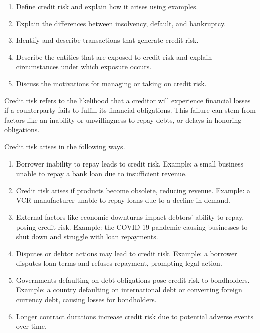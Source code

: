 
\begin{crkeybox}
\begin{enumerate}[label=\textbf{\alph*.},leftmargin=2em]
\item Define credit risk and explain how it arises using examples.
\item Explain the differences between insolvency, default, and bankruptcy.
\item Identify and describe transactions that generate credit risk.
\item Describe the entities that are exposed to credit risk and explain circumstances under which exposure occurs.
\item Discuss the motivations for managing or taking on credit risk.
\end{enumerate}
\end{crkeybox}


\begin{crdefbox}
Credit risk refers to the likelihood that a creditor will experience financial
losses if a counterparty fails to fulfill its financial obligations. This
failure can stem from factors like an inability or unwillingness to repay
debts, or delays in honoring obligations.
\end{crdefbox}

Credit risk arises in the following ways.

\begin{enumerate}
\item {} Borrower inability to repay leads to credit
risk. Example: a small business unable to repay a bank loan due to insufficient
revenue.
\item {} Credit risk arises if products become
obsolete, reducing revenue. Example: a VCR manufacturer unable to repay loans
due to a decline in demand.
\item {} External factors like economic downturns impact
debtors' ability to repay, posing credit risk. Example: the COVID-19 pandemic
causing businesses to shut down and struggle with loan repayments.
\item {} Disputes or debtor actions may lead
to credit risk. Example: a borrower disputes loan terms and refuses repayment,
prompting legal action.
\item {} Governments defaulting on debt obligations pose
credit risk to bondholders. Example: a country defaulting on international debt
or converting foreign currency debt, causing losses for bondholders.
\item {} Longer contract durations increase credit risk
due to potential adverse events over time.
\end{enumerate}

